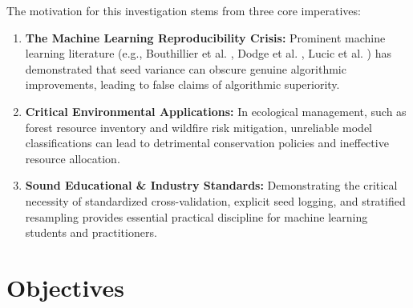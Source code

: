 The motivation for this investigation stems from three core imperatives:
\begin{enumerate}
    \item \textbf{The Machine Learning Reproducibility Crisis:} Prominent machine learning literature (e.g., Bouthillier et al. \cite{bouthillier2019unreproducible}, Dodge et al. \cite{dodge2020fine}, Lucic et al. \cite{lucic2018gans}) has demonstrated that seed variance can obscure genuine algorithmic improvements, leading to false claims of algorithmic superiority.
    \item \textbf{Critical Environmental Applications:} In ecological management, such as forest resource inventory and wildfire risk mitigation, unreliable model classifications can lead to detrimental conservation policies and ineffective resource allocation.
    \item \textbf{Sound Educational \& Industry Standards:} Demonstrating the critical necessity of standardized cross-validation, explicit seed logging, and stratified resampling provides essential practical discipline for machine learning students and practitioners.
\end{enumerate}

\section{Objectives}
\label{sec:objectives}

